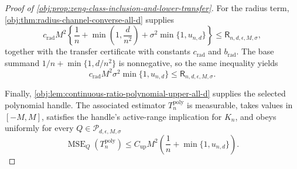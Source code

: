 \begin{proof}[Proof of \cref{obj:prop:zeng-class-inclusion-and-lower-transfer}]
For the radius term, \cref{obj:thm:radius-channel-converse-all-d} supplies
\[
c_{\mathrm{rad}}M^2
\left\{
\frac1n+\min\left(1,\frac d{n^2}\right)
+\sigma^2\min\{1,u_{n,d}\}
\right\}
\le
\mathsf R_{n,d,\epsilon,M,\sigma},
\]
together with the transfer certificate with constants \(c_{\mathrm{rad}}\) and \(b_{\mathrm{rad}}\).  The base summand \(1/n+\min\{1,d/n^2\}\) is nonnegative, so the same inequality yields
\[
c_{\mathrm{rad}}M^2\sigma^2\min\{1,u_{n,d}\}
\le
\mathsf R_{n,d,\epsilon,M,\sigma}.
\]

Finally, \cref{obj:lem:continuous-ratio-polynomial-upper-all-d} supplies the selected polynomial handle.  The associated estimator \(T_n^{\mathrm{poly}}\) is measurable, takes values in \([-M,M]\), satisfies the handle's active-range implication for \(K_n\), and obeys uniformly for every \(Q\in\mathcal P_{d,\epsilon,M,\sigma}\)
\[
\operatorname{MSE}_{Q}(T_n^{\mathrm{poly}})
\le
C_{\mathrm{up}}M^2\left(\frac1n+\min\{1,u_{n,d}\}\right).
\]
\end{proof}

